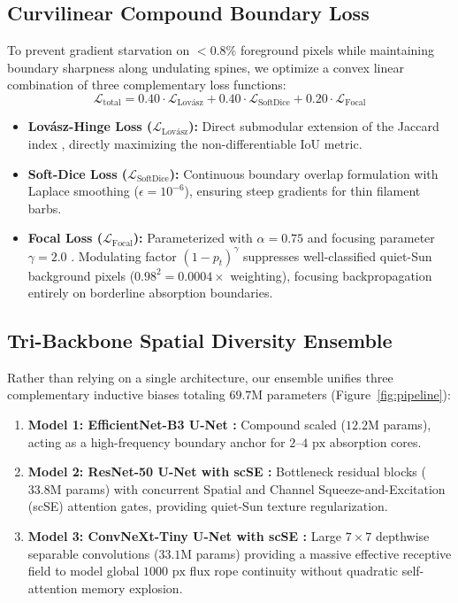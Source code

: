 \documentclass[sigconf]{acmart}
\begin{document}
\subsection{Curvilinear Compound Boundary Loss}
To prevent gradient starvation on $< 0.8\%$ foreground pixels while maintaining boundary sharpness along undulating spines, we optimize a convex linear combination of three complementary loss functions:
\begin{equation}
    \mathcal{L}_{\text{total}} = 0.40 \cdot \mathcal{L}_{\text{Lov\'asz}} + 0.40 \cdot \mathcal{L}_{\text{SoftDice}} + 0.20 \cdot \mathcal{L}_{\text{Focal}}
\end{equation}
\begin{itemize}
    \item \textbf{Lov\'asz-Hinge Loss ($\mathcal{L}_{\text{Lov\'asz}}$):} Direct submodular extension of the Jaccard index \cite{berman2018lovasz}, directly maximizing the non-differentiable IoU metric.
    \item \textbf{Soft-Dice Loss ($\mathcal{L}_{\text{SoftDice}}$):} Continuous boundary overlap formulation with Laplace smoothing ($\epsilon = 10^{-6}$), ensuring steep gradients for thin filament barbs.
    \item \textbf{Focal Loss ($\mathcal{L}_{\text{Focal}}$):} Parameterized with $\alpha = 0.75$ and focusing parameter $\gamma = 2.0$ \cite{lin2017focal}. Modulating factor $(1 - p_t)^\gamma$ suppresses well-classified quiet-Sun background pixels ($0.98^2 = 0.0004\times$ weighting), focusing backpropagation entirely on borderline absorption boundaries.
\end{itemize}

\subsection{Tri-Backbone Spatial Diversity Ensemble}
Rather than relying on a single architecture, our ensemble unifies three complementary inductive biases totaling $69.7\text{M}$ parameters (Figure~\ref{fig:pipeline}):
\begin{enumerate}
    \item \textbf{Model 1: EfficientNet-B3 U-Net \cite{tan2019efficientnet}:} Compound scaled ($12.2\text{M}$ params), acting as a high-frequency boundary anchor for $2\text{--}4\text{ px}$ absorption cores.
    \item \textbf{Model 2: ResNet-50 U-Net with scSE \cite{he2016deep,roy2018concurrent}:} Bottleneck residual blocks ($33.8\text{M}$ params) with concurrent Spatial and Channel Squeeze-and-Excitation (scSE) attention gates, providing quiet-Sun texture regularization.
    \item \textbf{Model 3: ConvNeXt-Tiny U-Net with scSE \cite{liu2022convnet}:} Large $7 \times 7$ depthwise separable convolutions ($33.1\text{M}$ params) providing a massive effective receptive field to model global $1000\text{ px}$ flux rope continuity without quadratic self-attention memory explosion.
\end{enumerate}
\end{document}
